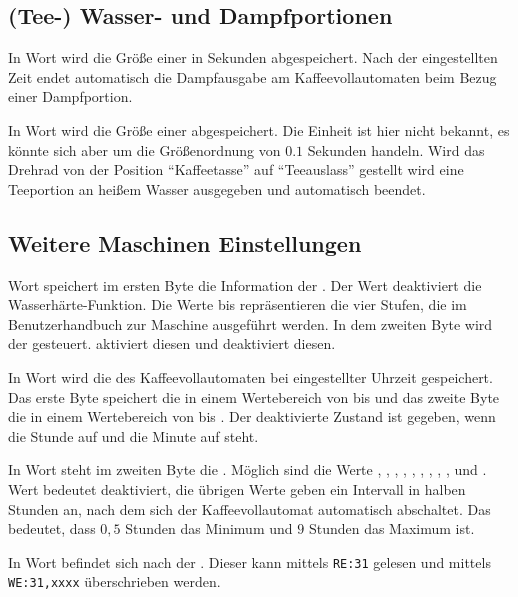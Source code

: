 \subsection{(Tee-) Wasser- und Dampfportionen}
In Wort  wird die Größe einer  in Sekunden abgespeichert.
Nach der eingestellten Zeit endet automatisch die Dampfausgabe am Kaffeevollautomaten beim Bezug einer Dampfportion.

In Wort  wird die Größe einer  abgespeichert.
Die Einheit ist hier nicht bekannt, es könnte sich aber um die Größenordnung von $0.1$ Sekunden handeln.
Wird das Drehrad von der Position "`Kaffeetasse"' auf "`Teeauslass"' gestellt wird eine Teeportion an heißem Wasser ausgegeben und automatisch beendet.

\subsection{Weitere Maschinen Einstellungen}
Wort  speichert im ersten Byte die Information der .
Der Wert  deaktiviert die Wasserhärte-Funktion.
Die Werte  bis  repräsentieren die vier Stufen, die im Benutzerhandbuch zur Maschine ausgeführt werden.
In dem zweiten Byte wird der  gesteuert.
 aktiviert diesen und  deaktiviert diesen.

In Wort  wird die  des Kaffeevollautomaten bei eingestellter Uhrzeit gespeichert.
Das erste Byte speichert die  in einem Wertebereich von  bis  und das zweite Byte die  in einem Wertebereich von  bis .
Der deaktivierte Zustand ist gegeben, wenn die Stunde auf  und die Minute auf  steht.

In Wort  steht im zweiten Byte die .
Möglich sind die Werte , , , , , , , , ,  und .
Wert  bedeutet deaktiviert, die übrigen Werte geben ein Intervall in halben Stunden an, nach dem sich der Kaffeevollautomat automatisch abschaltet.
Das bedeutet, dass $0,5$ Stunden das Minimum und $9$ Stunden das Maximum ist.

In Wort  befindet sich nach \cite{GitCoffeeMachine} der .
Dieser kann mittels \texttt{RE:31} gelesen und mittels \texttt{WE:31,xxxx} überschrieben werden.

